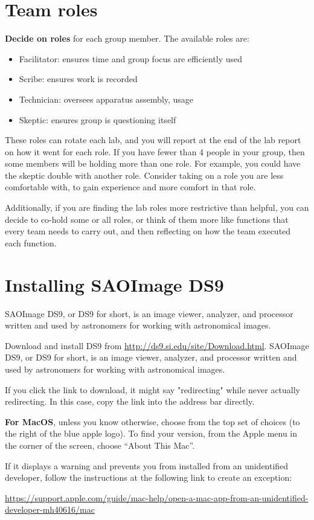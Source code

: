 \section{Team roles}

\textbf{Decide on roles} for each group member. The available roles are:

\begin{itemize}
	\item Facilitator: ensures time and group focus are efficiently used
	\item Scribe: ensures work is recorded
	\item Technician: oversees apparatus assembly, usage
	\item Skeptic: ensures group is questioning itself
\end{itemize}

These roles can rotate each lab, and you will report at the end of the lab report on how it went for each role. If you have fewer than 4 people in your group, then some members will be holding more than one role. For example, you could have the skeptic double with another role. Consider taking on a role you are less comfortable with, to gain experience and more comfort in that role.

Additionally, if you are finding the lab roles more restrictive than helpful, you can decide to co-hold some or all roles, or think of them more like functions that every team needs to carry out, and then reflecting on how the team executed each function.

\section{Installing SAOImage DS9}

SAOImage DS9, or DS9 for short, is an image viewer, analyzer, and processor written and used by astronomers for working with astronomical images.

\begin{steps}
	\item Download and install DS9 from \url{http://ds9.si.edu/site/Download.html}. SAOImage DS9, or DS9 for short, is an image viewer, analyzer, and processor written and used by astronomers for working with astronomical images.
	
	If you click the link to download, it might say "redirecting" while never actually redirecting. In this case, copy the link into the address bar directly.
	\begin{framed}	
		\textbf{For MacOS}, unless you know otherwise, choose from the top set of choices (to the right of
		the blue apple logo). To find your version, from the Apple menu in the corner of the screen,
		choose “About This Mac”.
		
		If it displays a warning and prevents you from installed from an unidentified developer, follow the instructions at the following link to create an exception:
		
		\url{https://support.apple.com/guide/mac-help/open-a-mac-app-from-an-unidentified-developer-mh40616/mac}
	\end{framed}
\end{steps}

